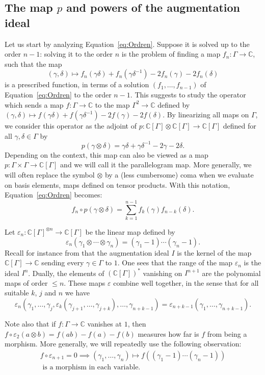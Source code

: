 \documentclass[11pt]{article}
\theoremstyle{definition}
\newcommand{\CC}{\mathbb{C}}
\begin{document}
\subsection{The map $p$ and powers of the augmentation ideal}

Let us start by analyzing Equation~\eqref{eq:Ordren}. Suppose it is solved
up to the order
$n-1$: solving it to the order
$n$ is the problem of finding
a map $f_n\colon\Gamma\to\CC$, such that the map
\[ (\gamma,\delta)\mapsto f_n(\gamma\delta)+f_n(\gamma\delta^{-1})
-2f_n(\gamma)-2f_n(\delta) \]
is a prescribed function, in terms of a solution
$(f_1,\ldots,f_{n-1})$ of
Equation~\eqref{eq:Ordren} to the order $n-1$.
This suggests to study the operator
which sends a map $f\colon\Gamma\to\CC$ to the map $\Gamma^2\to\CC$ defined by
$(\gamma,\delta)\mapsto f(\gamma\delta)+f(\gamma\delta^{-1})-2f(\gamma)
-2f(\delta)$.
By linearizing all maps on $\Gamma$, we consider this operator as the
adjoint of
$p:\CC[\Gamma]\otimes\CC[\Gamma]\to\CC[\Gamma]$ defined for all
$\gamma,\delta\in \Gamma$ by
\[ p(\gamma\otimes\delta)=\gamma\delta+\gamma\delta^{-1}-2\gamma-2\delta. \]
Depending on the context, this map can also be viewed as a map
$p:\Gamma\times \Gamma\to\CC[\Gamma]$ and we will call it the parallelogram
map. More generally, we will often replace the symbol
$\otimes$ by a (less cumbersome) coma when we evaluate on basis elements,
maps defined on tensor products.
With this notation, Equation~\eqref{eq:Ordren} becomes:
\begin{equation}\label{eq:Oordren}
f_n\circ p(\gamma\otimes\delta) =
\sum_{k=1}^{n-1}f_k(\gamma)f_{n-k}(\delta).
\end{equation}

Let $\varepsilon_n\colon\CC[\Gamma]^{\otimes n}\to\CC[\Gamma]$ be the
linear map defined by
\[ \varepsilon_n(\gamma_1\otimes\cdots\otimes\gamma_n)
=(\gamma_1-1)\cdots(\gamma_n-1). \]
Recall for instance from \cite{Passi} that the augmentation ideal $I$ is the
kernel of the map $\CC[\Gamma]\to\CC$ sending every $\gamma\in \Gamma$ to $1$.
One sees that the range of the map $\varepsilon_n$ is the ideal $I^n$.
Dually, the elements of $(\CC[\Gamma])^*$ vanishing on $I^{n+1}$ are the
polynomial maps of order $\leq n$.
These maps $\varepsilon$ combine well together, in the sense that for all
suitable $k$, $j$ and $n$ we have
\[
\varepsilon_n(\gamma_1,\dots,\gamma_j,
\varepsilon_k(\gamma_{j+1},\dots,\gamma_{j+k}),\dots,\gamma_{n+k-1})=
\varepsilon_{n+k-1}(\gamma_1,\dots,\gamma_{n+k-1}).
\]

Note also that if $f\colon\Gamma\to\CC$ vanishes at $1$, then
$f\circ\varepsilon_2(a\otimes b)=f(ab)-f(a)-f(b)$ measures how far is
$f$ from being a morphism. More generally, we will repeatedly use the
following observation:
\begin{multline}\label{testmulti}
f\circ\varepsilon_{n+1}=0\implies
(\gamma_1,\ldots,\gamma_n)\mapsto f((\gamma_1-1)\cdots(\gamma_n-1))\\[-3pt]
\text{ is a morphism in each variable.}
\end{multline}
\end{document}
